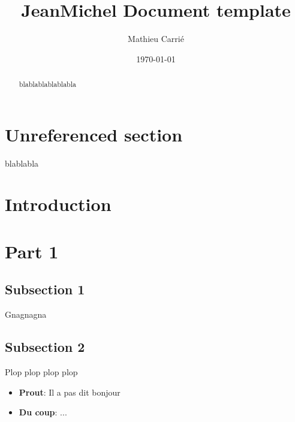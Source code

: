 \documentclass[]{jeanmicheldoc}
\title{JeanMichel Document template}
\author{Mathieu Carrié}
\date{\today}
\begin{document}
\maketitle

\newpage

\vspace{5cm}
\begin{abstract}
    blablablablablabla
\end{abstract}

\newpage

\section*{Unreferenced section}

blablabla

\newpage

\pagestyle{fancy}

{
    \hypersetup{linkcolor=blue!30!black}
    \tableofcontents
}

\newpage

\section{Introduction}
\section{Part 1}
    \subsection{Subsection 1}
    Gnagnagna
    \subsection{Subsection 2}
    Plop plop plop plop
\begin{itemize}
	\item \textbf{Prout}: Il a pas dit bonjour
    \item \textbf{Du coup}: ...
\end{itemize}
\end{document}
